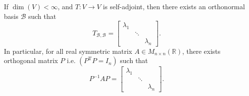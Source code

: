 \begin{corollary}
If \(\dim(V) < \infty\), and \(T : V \rightarrow V\) is self-adjoint, then there exists an orthonormal basis \(\mathcal{B}\) such that
\[T_{\mathcal{B},\mathcal{B}} = \begin{bmatrix} \lambda_1 &  &  \\  & \ddots &  \\  &  & \lambda_n \end{bmatrix}.\]
In particular, for all real symmetric matrix \(A \in  M_{n \times n}({\mathbb{R}})\), there exists orthogonal matrix \(P\) i.e. \(\left( {{P}^{\mathrm{T}}P = {I}_{n}}\right)\) such that
\[
{P}^{-1}{AP} = \begin{bmatrix} \lambda_1 &  &  \\  & \ddots &  \\  &  & \lambda_n \end{bmatrix}.
\]
\end{corollary}
